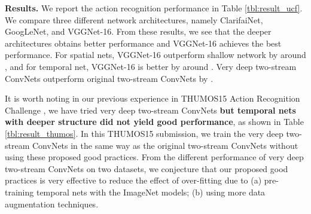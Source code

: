 \documentclass[10pt,twocolumn,letterpaper]{article}
\begin{document}
{\bf Results.} We report the action recognition performance in Table \ref{tbl:result_ucf}. We compare three different network architectures, namely ClarifaiNet, GoogLeNet, and VGGNet-16. From these results, we see that the deeper architectures obtains better performance and VGGNet-16 achieves the best performance. For spatial nets, VGGNet-16 outperform shallow network by around , and for temporal net, VGGNet-16 is better by around . Very deep two-stream ConvNets outperform original two-stream ConvNets by .

It is worth noting in our previous experience \cite{WangWXQ15} in THUMOS15 Action Recognition Challenge \cite{THUMOS15}, we have tried very deep two-stream ConvNets {\bf but temporal nets with deeper structure did not yield good performance}, as shown in Table \ref{tbl:result_thumos}. In this THUMOS15 submission, we train the very deep two-stream ConvNets in the same way as the original two-stream ConvNets \cite{SimonyanZ14} without using these proposed good practices. From the different performance of very deep two-stream ConvNets on two datasets, we conjecture that our proposed good practices is very effective to reduce the effect of over-fitting due to (a) pre-training temporal nets with the ImageNet models; (b) using more data augmentation techniques.

\begin{table}
\begin{center}
\vspace{2mm}
\caption{Performance comparison with the state of the art on UCF101 dataset.}
\label{tbl:comparison}
\end{center}
\end{table}
\end{document}
